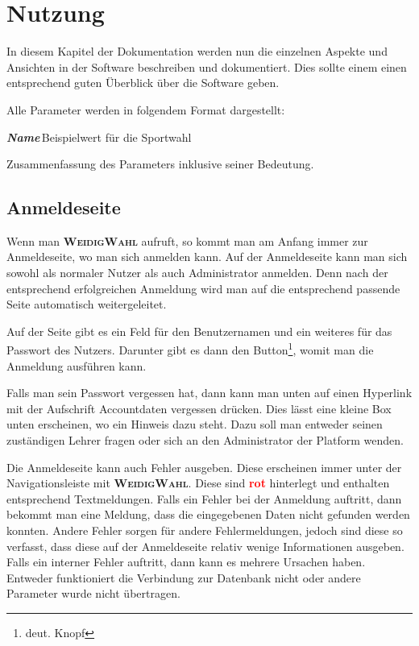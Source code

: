 \documentclass[ngerman]{ltxdoc}
\newcommand{\DescribeOption}[4]{
  \DescribeMacro{#1}
  \begin{minipage}[t]{\textwidth}
    \textit{\textbf{\textcolor{mLightGreen}{#2}}}\dotfill\,#3\par
    \begingroup
    \vspace{0.5em}#4\par
    \endgroup
  \end{minipage}
}
\newcommand{\name}{\textbf{\textsc{WeidigWahl}}\xspace}
\begin{document}
\section{Nutzung}

In diesem Kapitel der Dokumentation werden nun die einzelnen Aspekte und Ansichten
in der Software beschreiben und dokumentiert. Dies sollte einem einen entsprechend
guten Überblick über die Software geben.

Alle Parameter werden in folgendem Format dargestellt:

\DescribeOption{Stichwort}{Name}{Beispielwert für die Sportwahl}{
  Zusammenfassung des Parameters inklusive seiner Bedeutung.
}

\subsection{Anmeldeseite}

Wenn man \name aufruft, so kommt man am Anfang immer zur Anmeldeseite, wo man sich
anmelden kann. Auf der Anmeldeseite kann man sich sowohl als normaler Nutzer als
auch Administrator anmelden. Denn nach der entsprechend erfolgreichen Anmeldung
wird man auf die entsprechend passende Seite automatisch weitergeleitet.

Auf der Seite gibt es ein Feld für den Benutzernamen und ein weiteres für das
Passwort des Nutzers. Darunter gibt es dann den Button\footnote{deut. Knopf}, womit
man die Anmeldung ausführen kann.

Falls man sein Passwort vergessen hat, dann kann man unten auf einen Hyperlink
mit der Aufschrift \glqq Accountdaten vergessen\grqq{} drücken. Dies lässt eine kleine
Box unten erscheinen, wo ein Hinweis dazu steht. Dazu soll man entweder seinen
zuständigen Lehrer fragen oder sich an den Administrator der Platform wenden.

Die Anmeldeseite kann auch Fehler ausgeben. Diese erscheinen immer unter der
Navigationsleiste mit \name. Diese sind \textcolor{red}{\textbf{rot}} hinterlegt
und enthalten entsprechend Textmeldungen. Falls ein Fehler bei der Anmeldung auftritt,
dann bekommt man eine Meldung, dass die eingegebenen Daten nicht gefunden werden konnten.
Andere Fehler sorgen für andere Fehlermeldungen, jedoch sind diese so verfasst,
dass diese auf der Anmeldeseite relativ wenige Informationen ausgeben. Falls ein
interner Fehler auftritt, dann kann es mehrere Ursachen haben. Entweder funktioniert
die Verbindung zur Datenbank nicht oder andere Parameter wurde nicht übertragen.
\end{document}
